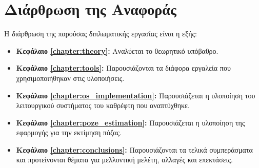 \section{Διάρθρωση της Αναφοράς}
\label{section:layout}

Η διάρθρωση της παρούσας διπλωματικής εργασίας είναι η εξής:

\begin{itemize}
	\item{\textbf{Κεφάλαιο \ref{chapter:theory}:} Αναλύεται το θεωρητικό υπόβαθρο. 
	}
	\item{\textbf{Κεφάλαιο \ref{chapter:tools}:} Παρουσιάζονται τα διάφορα εργαλεία που χρησιμοποιήθηκαν στις υλοποιήσεις.
	}
	\item{\textbf{Κεφάλαιο \ref{chapter:os_implementation}:} Παρουσιάζεται η υλοποίηση του λειτουργικού συστήματος του καθρέφτη που αναπτύχθηκε.
	}
	\item{\textbf{Κεφάλαιο \ref{chapter:poze_estimation}:} Παρουσιάζεται η υλοποίηση της εφαρμογής για την εκτίμηση πόζας.
	}
	\item{\textbf{Κεφάλαιο \ref{chapter:conclusions}:} Παρουσιάζονται τα τελικά συμπεράσματα και προτείνονται θέματα για μελλοντική μελέτη, αλλαγές και επεκτάσεις.
	}

\end{itemize}

